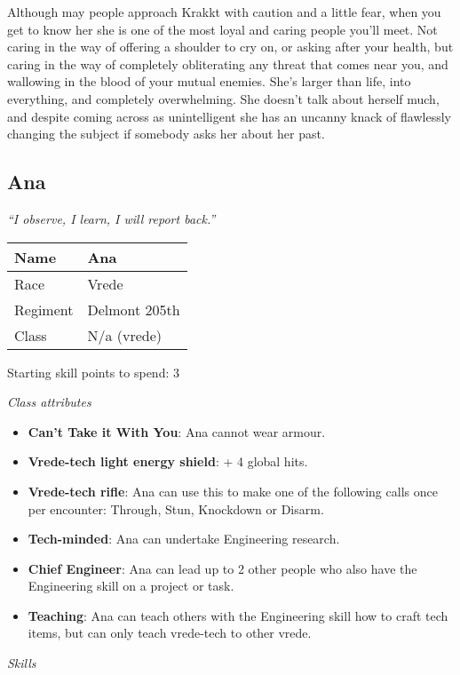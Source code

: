 \documentclass{scrbook}
\begin{document}
Although may people approach Krakkt with caution and a little fear, when you get to know her she is one of the most loyal and caring people you'll meet. Not caring in the way of offering a shoulder to cry on, or asking after your health, but caring in the way of completely obliterating any threat that comes near you, and wallowing in the blood of your mutual enemies. She's larger than life, into everything, and completely overwhelming. She doesn't talk about herself much, and despite coming across as unintelligent she has an uncanny knack of flawlessly changing the subject if somebody asks her about her past.

\subsection{Ana}

\textit{``I observe, I learn, I will report back.''}

\begin{table}
\begin{tabular}{|l|l|} \hline 
Name & Ana \\
 \hline Race & Vrede \\
 \hline Regiment & Delmont 205th \\
 \hline Class & N/a (vrede) \\
 \hline \end{tabular}

\end{table}

Starting skill points to spend: 3

\textit{Class attributes}

\begin{itemize}
\item \textbf{Can't Take it With You}: Ana cannot wear armour.

\item \textbf{Vrede-tech light energy shield}: + 4 global hits.

\item \textbf{Vrede-tech rifle}: Ana can use this to make one of the following calls once per encounter: Through, Stun, Knockdown or Disarm.

\item \textbf{Tech-minded}: Ana can undertake Engineering research.

\item \textbf{Chief Engineer}: Ana can lead up to 2 other people who also have the Engineering skill on a project or task.

\item \textbf{Teaching}: Ana can teach others with the Engineering skill how to craft tech items, but can only teach vrede-tech to other vrede.

\end{itemize}
\textit{Skills}
\end{document}
